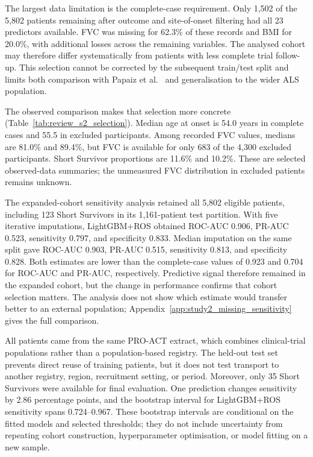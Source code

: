 The largest data limitation is the complete-case requirement. Only 1,502 of the 5,802 patients remaining after outcome and site-of-onset filtering had all 23 predictors available. FVC was missing for 62.3\% of these records and BMI for 20.0\%, with additional losses across the remaining variables. The analysed cohort may therefore differ systematically from patients with less complete trial follow-up. This selection cannot be corrected by the subsequent train/test split and limits both comparison with Papaiz et al.~\cite{Papaiz2024} and generalisation to the wider ALS population.

The observed comparison makes that selection more concrete (Table~\ref{tab:review_s2_selection}). Median age at onset is 54.0 years in complete cases and 55.5 in excluded participants. Among recorded FVC values, medians are 81.0\% and 89.4\%, but FVC is available for only 683 of the 4,300 excluded participants. Short Survivor proportions are 11.6\% and 10.2\%. These are selected observed-data summaries; the unmeasured FVC distribution in excluded patients remains unknown.

The expanded-cohort sensitivity analysis retained all 5,802 eligible patients, including 123 Short Survivors in its 1,161-patient test partition. With five iterative imputations, LightGBM+ROS obtained ROC-AUC 0.906, PR-AUC 0.523, sensitivity 0.797, and specificity 0.833. Median imputation on the same split gave ROC-AUC 0.903, PR-AUC 0.515, sensitivity 0.813, and specificity 0.828. Both estimates are lower than the complete-case values of 0.923 and 0.704 for ROC-AUC and PR-AUC, respectively. Predictive signal therefore remained in the expanded cohort, but the change in performance confirms that cohort selection matters. The analysis does not show which estimate would transfer better to an external population; Appendix~\ref{app:study2_missing_sensitivity} gives the full comparison.

All patients came from the same PRO-ACT extract, which combines clinical-trial populations rather than a population-based registry. The held-out test set prevents direct reuse of training patients, but it does not test transport to another registry, region, recruitment setting, or period. Moreover, only 35 Short Survivors were available for final evaluation. One prediction changes sensitivity by 2.86 percentage points, and the bootstrap interval for LightGBM+ROS sensitivity spans 0.724--0.967. These bootstrap intervals are conditional on the fitted models and selected thresholds; they do not include uncertainty from repeating cohort construction, hyperparameter optimisation, or model fitting on a new sample.

